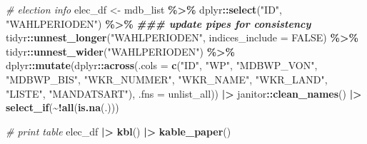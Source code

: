 \documentclass[
]{article}
\newenvironment{Shaded}{\begin{snugshade}}{\end{snugshade}}
\newcommand{\AttributeTok}[1]{\textcolor[rgb]{0.13,0.29,0.53}{#1}}
\newcommand{\CommentTok}[1]{\textcolor[rgb]{0.56,0.35,0.01}{\textit{#1}}}
\newcommand{\ConstantTok}[1]{\textcolor[rgb]{0.56,0.35,0.01}{#1}}
\newcommand{\DocumentationTok}[1]{\textcolor[rgb]{0.56,0.35,0.01}{\textbf{\textit{#1}}}}
\newcommand{\FunctionTok}[1]{\textcolor[rgb]{0.13,0.29,0.53}{\textbf{#1}}}
\newcommand{\NormalTok}[1]{#1}
\newcommand{\OtherTok}[1]{\textcolor[rgb]{0.56,0.35,0.01}{#1}}
\newcommand{\SpecialCharTok}[1]{\textcolor[rgb]{0.81,0.36,0.00}{\textbf{#1}}}
\newcommand{\StringTok}[1]{\textcolor[rgb]{0.31,0.60,0.02}{#1}}
\begin{document}
\begin{Shaded}
\begin{Highlighting}[]
\CommentTok{\# election info}
\NormalTok{elec\_df }\OtherTok{\textless{}{-}}\NormalTok{ mdb\_list }\SpecialCharTok{\%\textgreater{}\%}
\NormalTok{    dplyr}\SpecialCharTok{::}\FunctionTok{select}\NormalTok{(}\StringTok{"ID"}\NormalTok{, }\StringTok{"WAHLPERIODEN"}\NormalTok{) }\SpecialCharTok{\%\textgreater{}\%} \DocumentationTok{\#\#\# update pipes for consistency}
\NormalTok{    tidyr}\SpecialCharTok{::}\FunctionTok{unnest\_longer}\NormalTok{(}\StringTok{"WAHLPERIODEN"}\NormalTok{, }\AttributeTok{indices\_include =} \ConstantTok{FALSE}\NormalTok{) }\SpecialCharTok{\%\textgreater{}\%}
\NormalTok{    tidyr}\SpecialCharTok{::}\FunctionTok{unnest\_wider}\NormalTok{(}\StringTok{"WAHLPERIODEN"}\NormalTok{) }\SpecialCharTok{\%\textgreater{}\%}
\NormalTok{    dplyr}\SpecialCharTok{::}\FunctionTok{mutate}\NormalTok{(dplyr}\SpecialCharTok{::}\FunctionTok{across}\NormalTok{(}\AttributeTok{.cols =} \FunctionTok{c}\NormalTok{(}\StringTok{"ID"}\NormalTok{,}
                                          \StringTok{"WP"}\NormalTok{,}
                                          \StringTok{"MDBWP\_VON"}\NormalTok{,}
                                          \StringTok{"MDBWP\_BIS"}\NormalTok{,}
                                          \StringTok{"WKR\_NUMMER"}\NormalTok{,}
                                          \StringTok{"WKR\_NAME"}\NormalTok{,}
                                          \StringTok{"WKR\_LAND"}\NormalTok{,}
                                          \StringTok{"LISTE"}\NormalTok{,}
                                          \StringTok{"MANDATSART"}\NormalTok{),}
                                \AttributeTok{.fns =}\NormalTok{ unlist\_all)) }\SpecialCharTok{|\textgreater{}} 
\NormalTok{    janitor}\SpecialCharTok{::}\FunctionTok{clean\_names}\NormalTok{() }\SpecialCharTok{|\textgreater{}} 
    \FunctionTok{select\_if}\NormalTok{(}\SpecialCharTok{\textasciitilde{}!}\FunctionTok{all}\NormalTok{(}\FunctionTok{is.na}\NormalTok{(.)))}

\CommentTok{\# print table}
\NormalTok{elec\_df }\SpecialCharTok{|\textgreater{}} 
  \FunctionTok{kbl}\NormalTok{() }\SpecialCharTok{|\textgreater{}} 
  \FunctionTok{kable\_paper}\NormalTok{()}
\end{Highlighting}
\end{Shaded}
\end{document}
